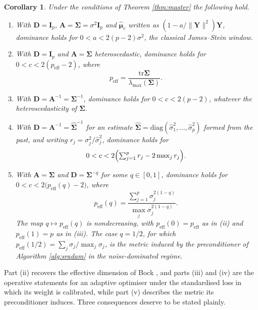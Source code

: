 \documentclass[pdflatex,sn-mathphys-num]{sn-jnl}%
\theoremstyle{thmstyleone}%
\newtheorem{corollary}[theorem]{Corollary}%
\theoremstyle{thmstyletwo}%
\theoremstyle{thmstylethree}%
\newcommand{\rev}[1]{#1}
\newenvironment{revblock}{}{}
\newcommand{\peff}{p_{\mathrm{eff}}}
\newcommand{\peffq}[1]{p_{\mathrm{eff}}(#1)}
\newcommand{\tr}{\mathrm{tr}}
\newcommand{\diag}{\mathrm{diag}}
\begin{document}
\begin{corollary}
\label{cor:cases}
Under the conditions of Theorem \ref{thm:master} the following hold.
\begin{enumerate}
\item[(i)] With $\bm D=\bm I_p$, $\bm A=\bm\Sigma=\sigma^2\bm I_p$ and $\hat{\bm\mu}_c$ written as $(1-a/\|\bm Y\|^2)\bm Y$, dominance holds for $0<a<2(p-2)\sigma^2$, the classical James--Stein window.
\item[(ii)] With $\bm D=\bm I_p$ and $\bm A=\bm\Sigma$ heteroscedastic, dominance holds for $0<c<2(\peff-2)$, where
\begin{equation}
\peff=\frac{\tr\bm\Sigma}{\lambda_{\max}(\bm\Sigma)} .
\end{equation}
\item[(iii)] With $\bm D=\bm A^{-1}=\bm\Sigma^{-1}$, dominance holds for $0<c<2(p-2)$, whatever the heteroscedasticity of $\bm\Sigma$.
\item[(iv)] With $\bm D=\bm A^{-1}=\widehat{\bm\Sigma}^{-1}$ for an estimate $\widehat{\bm\Sigma}=\diag(\hat\sigma^2_1,\dots,\hat\sigma^2_p)$ formed from the past, and writing $r_j=\sigma^2_j/\hat\sigma^2_j$, dominance holds for
\begin{equation}
\label{eq:plugin_window}
0<c<2\Bigl(\textstyle\sum_{j=1}^{p}r_j-2\max_{j}r_j\Bigr) .
\end{equation}
\item[(v)] With $\bm A=\bm\Sigma$ and $\bm D=\bm\Sigma^{-q}$ for some $q\in[0,1]$, dominance holds for $0<c<2\bigl(\peffq{q}-2\bigr)$, where
\begin{equation}
\label{eq:peff_q}
\peffq{q}=\frac{\sum_{j=1}^{p}\sigma_j^{2(1-q)}}{\max_{j}\sigma_j^{2(1-q)}} .
\end{equation}
The map $q\mapsto\peffq{q}$ is nondecreasing, with $\peffq{0}=\peff$ as in (ii) and $\peffq{1}=p$ as in (iii). The case $q=1/2$, for which $\peffq{1/2}=\sum_j\sigma_j/\max_j\sigma_j$, is the metric induced by the preconditioner of Algorithm \ref{alg:sradam} in the noise-dominated regime.
\end{enumerate}
\end{corollary}

Part (ii) recovers the effective dimension of Bock \cite{bock1975}, and parts (iii) and (iv) are the operative statements for an adaptive optimiser\rev{ under the standardised loss in which its weight is calibrated, while part (v) describes the metric its preconditioner induces}. Three consequences deserve to be stated plainly.
\end{document}
